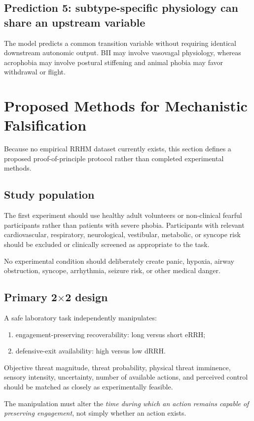 \documentclass[11pt]{article}
\begin{document}
\subsection{Prediction 5: subtype-specific physiology can share an upstream variable}
The model predicts a common transition variable without requiring identical downstream autonomic output. BII may involve vasovagal physiology, whereas acrophobia may involve postural stiffening and animal phobia may favor withdrawal or flight.

\section{Proposed Methods for Mechanistic Falsification}
Because no empirical RRHM dataset currently exists, this section defines a proposed proof-of-principle protocol rather than completed experimental methods.

\subsection{Study population}
The first experiment should use healthy adult volunteers or non-clinical fearful participants rather than patients with severe phobia. Participants with relevant cardiovascular, respiratory, neurological, vestibular, metabolic, or syncope risk should be excluded or clinically screened as appropriate to the task.

No experimental condition should deliberately create panic, hypoxia, airway obstruction, syncope, arrhythmia, seizure risk, or other medical danger.

\subsection{Primary 2$\times$2 design}
A safe laboratory task independently manipulates:
\begin{enumerate}[leftmargin=2em]
\item engagement-preserving recoverability: long versus short eRRH;
\item defensive-exit availability: high versus low dRRH.
\end{enumerate}

Objective threat magnitude, threat probability, physical threat imminence, sensory intensity, uncertainty, number of available actions, and perceived control should be matched as closely as experimentally feasible.

The manipulation must alter the \emph{time during which an action remains capable of preserving engagement}, not simply whether an action exists.
\end{document}

